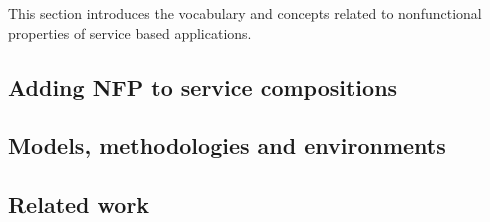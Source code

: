 
This section introduces the vocabulary and concepts related to nonfunctional properties of service based applications.

\subsection{Adding NFP to service compositions}


\subsection{Models, methodologies and environments}

\subsection{Related work}